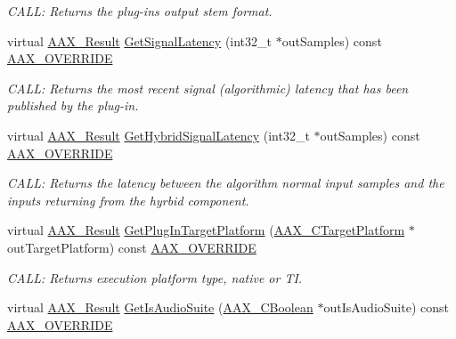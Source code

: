\begin{DoxyCompactItemize}
\begin{DoxyCompactList}\small\item\em C\+A\+L\+L\+: Returns the plug-\/in\textquotesingle{}s output stem format. \end{DoxyCompactList}\item 
virtual \hyperlink{a00149_a4d8f69a697df7f70c3a8e9b8ee130d2f}{A\+A\+X\+\_\+\+Result} \hyperlink{a00132_ace617af1586478b9f3f88d9c76c77267}{Get\+Signal\+Latency} (int32\+\_\+t $\ast$out\+Samples) const \hyperlink{a00149_ac2f24a5172689ae684344abdcce55463}{A\+A\+X\+\_\+\+O\+V\+E\+R\+R\+I\+D\+E}
\begin{DoxyCompactList}\small\item\em C\+A\+L\+L\+: Returns the most recent signal (algorithmic) latency that has been published by the plug-\/in. \end{DoxyCompactList}\item 
virtual \hyperlink{a00149_a4d8f69a697df7f70c3a8e9b8ee130d2f}{A\+A\+X\+\_\+\+Result} \hyperlink{a00132_abd2f38749bd13d2cf54b79d007dd993f}{Get\+Hybrid\+Signal\+Latency} (int32\+\_\+t $\ast$out\+Samples) const \hyperlink{a00149_ac2f24a5172689ae684344abdcce55463}{A\+A\+X\+\_\+\+O\+V\+E\+R\+R\+I\+D\+E}
\begin{DoxyCompactList}\small\item\em C\+A\+L\+L\+: Returns the latency between the algorithm normal input samples and the inputs returning from the hyrbid component. \end{DoxyCompactList}\item 
virtual \hyperlink{a00149_a4d8f69a697df7f70c3a8e9b8ee130d2f}{A\+A\+X\+\_\+\+Result} \hyperlink{a00132_a04e05a8e9409e1dc05598fa13e0873cc}{Get\+Plug\+In\+Target\+Platform} (\hyperlink{a00149_a8f2cefa455217fa9f3ce190fe5fd8033}{A\+A\+X\+\_\+\+C\+Target\+Platform} $\ast$out\+Target\+Platform) const \hyperlink{a00149_ac2f24a5172689ae684344abdcce55463}{A\+A\+X\+\_\+\+O\+V\+E\+R\+R\+I\+D\+E}
\begin{DoxyCompactList}\small\item\em C\+A\+L\+L\+: Returns execution platform type, native or T\+I. \end{DoxyCompactList}\item 
virtual \hyperlink{a00149_a4d8f69a697df7f70c3a8e9b8ee130d2f}{A\+A\+X\+\_\+\+Result} \hyperlink{a00132_a23a216997d28e89e4ce3bd1c858e7180}{Get\+Is\+Audio\+Suite} (\hyperlink{a00149_aa216506530f1d19a2965931ced2b274b}{A\+A\+X\+\_\+\+C\+Boolean} $\ast$out\+Is\+Audio\+Suite) const \hyperlink{a00149_ac2f24a5172689ae684344abdcce55463}{A\+A\+X\+\_\+\+O\+V\+E\+R\+R\+I\+D\+E}

\end{DoxyCompactItemize}
